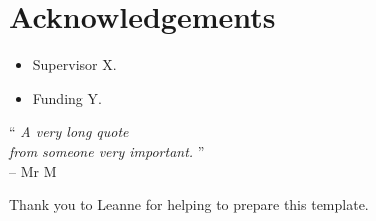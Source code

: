 \chapter*{Acknowledgements}
\makeatletter{}\makeatother

\begin{itemize}
	\item Supervisor X.
	\item Funding Y.
\end{itemize}
\begin{centering}
{\LARGE``} \textit{A very long quote}\\
\textit{from someone very important.} {\LARGE''}\\
-- Mr M\\


\vfill

Thank you to Leanne for helping to prepare this template. 


\end{centering}
